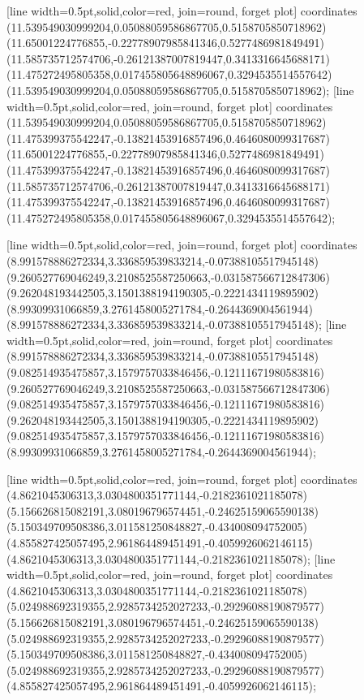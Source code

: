 [line width=0.5pt,solid,color=red, join=round, forget plot] coordinates {(11.539549030999204,0.05088059586867705,0.5158705850718962) (11.65001224776855,-0.22778907985841346,0.5277486981849491) (11.585735712574706,-0.26121387007819447,0.3413316645688171) (11.475272495805358,0.017455805648896067,0.3294535514557642) (11.539549030999204,0.05088059586867705,0.5158705850718962)};
[line width=0.5pt,solid,color=red, join=round, forget plot] coordinates {(11.539549030999204,0.05088059586867705,0.5158705850718962) (11.475399375542247,-0.13821453916857496,0.4646080099317687) (11.65001224776855,-0.22778907985841346,0.5277486981849491) (11.475399375542247,-0.13821453916857496,0.4646080099317687) (11.585735712574706,-0.26121387007819447,0.3413316645688171) (11.475399375542247,-0.13821453916857496,0.4646080099317687) (11.475272495805358,0.017455805648896067,0.3294535514557642)};

[line width=0.5pt,solid,color=red, join=round, forget plot] coordinates {(8.991578886272334,3.336859539833214,-0.07388105517945148) (9.260527769046249,3.2108525587250663,-0.031587566712847306) (9.262048193442505,3.1501388194190305,-0.2221434119895902) (8.99309931066859,3.2761458005271784,-0.2644369004561944) (8.991578886272334,3.336859539833214,-0.07388105517945148)};
[line width=0.5pt,solid,color=red, join=round, forget plot] coordinates {(8.991578886272334,3.336859539833214,-0.07388105517945148) (9.082514935475857,3.1579757033846456,-0.12111671980583816) (9.260527769046249,3.2108525587250663,-0.031587566712847306) (9.082514935475857,3.1579757033846456,-0.12111671980583816) (9.262048193442505,3.1501388194190305,-0.2221434119895902) (9.082514935475857,3.1579757033846456,-0.12111671980583816) (8.99309931066859,3.2761458005271784,-0.2644369004561944)};

[line width=0.5pt,solid,color=red, join=round, forget plot] coordinates {(4.8621045306313,3.0304800351771144,-0.2182361021185078) (5.156626815082191,3.080196796574451,-0.24625159065590138) (5.150349709508386,3.011581250848827,-0.434008094752005) (4.855827425057495,2.961864489451491,-0.4059926062146115) (4.8621045306313,3.0304800351771144,-0.2182361021185078)};
[line width=0.5pt,solid,color=red, join=round, forget plot] coordinates {(4.8621045306313,3.0304800351771144,-0.2182361021185078) (5.024988692319355,2.9285734252027233,-0.29296088190879577) (5.156626815082191,3.080196796574451,-0.24625159065590138) (5.024988692319355,2.9285734252027233,-0.29296088190879577) (5.150349709508386,3.011581250848827,-0.434008094752005) (5.024988692319355,2.9285734252027233,-0.29296088190879577) (4.855827425057495,2.961864489451491,-0.4059926062146115)};

